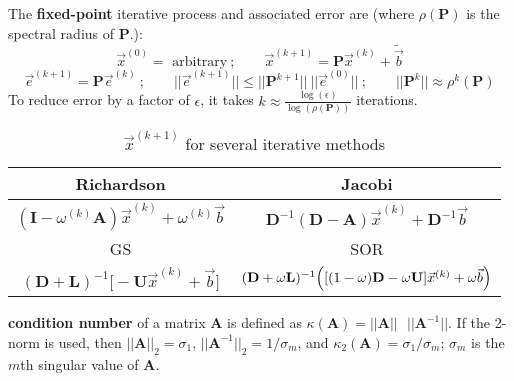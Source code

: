 \documentclass[12pt]{article}
\newcommand{\ve}[1]{\ensuremath{\mathbf{#1}}}
\begin{document}
The \textbf{fixed-point} iterative process and associated error are (where $\rho(\ve{P})$ is the spectral radius of $\ve{P}$.):
\[\vec{x}^{(0)} = \text{ arbitrary}\:; \qquad
\vec{x}^{(k+1)} = \ve{P}\vec{x}^{(k)} + \tilde{\vec{b}} \]
\[\vec{e}^{(k+1)} = \ve{P}\vec{e}^{(k)}\:; 
 \qquad ||\vec{e}^{(k+1)}|| \leq ||\ve{P}^{k+1}||\: ||\vec{e}^{(0)}||\:;
 \qquad || \ve{P}^k || \approx \rho^k (\ve{P})\]
%
To reduce error by a factor of $\epsilon$, it takes $k \approx \frac{\log(\epsilon)}{\log(\rho(\ve{P}))}$ iterations. 
%
    \begin{table}[h!]
    \centering
      \begin{tabular}{| c | c | }
        \hline
        Richardson & Jacobi \\ \hline
        \hline
        $(\ve{I} - \omega^{(k)}\ve{A})\vec{x}^{(k)} + \omega^{(k)}\vec{b}$   &  
        $ \ve{D}^{-1}(\ve{D} - \ve{A})\vec{x}^{(k)} + \ve{D}^{-1}\vec{b}$  \\
        \hline  
        GS & SOR \\ \hline
        $ (\ve{D} + \ve{L})^{-1} \bigl[-\ve{U} \vec{x}^{(k)} + \vec{b}\bigr] $ &  
        $ (\ve{D} + \omega \ve{L})^{-1} \Bigl( [(1-\omega)\ve{D} - \omega \ve{U}] \vec{x}^{(k)} + \omega\vec{b} \Bigr)$ \\
        \hline        
      \end{tabular}
      \caption{$\vec{x}^{(k+1)}$ for several iterative methods}
      \label{tab:delayedneutrons}
    \end{table}
%

\vspace*{-1em}
\textbf{condition number} of a matrix $\mathbf{A}$ is defined as $\kappa(\mathbf{A}) = ||\mathbf{A}|| \text{ }||\mathbf{A}^{-1}||$.
%
If the 2-norm is used, then $||\mathbf{A}||_{2} = \sigma_{1}$, $||\mathbf{A}^{-1}||_{2} = 1 / \sigma_{m}$, and $\kappa_{2}(\mathbf{A}) = \sigma_{1} / \sigma_{m}$; $\sigma_{m}$ is the $m$th singular value of $\ve{A}$. %
\end{document}
